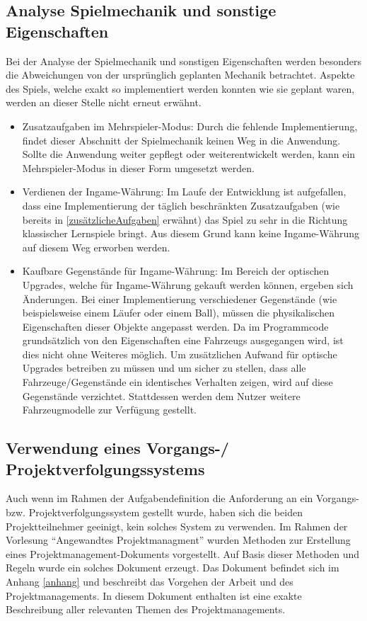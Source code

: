 \subsection{Analyse Spielmechanik und sonstige Eigenschaften}
Bei der Analyse der Spielmechanik und sonstigen Eigenschaften werden besonders die Abweichungen von der ursprünglich geplanten Mechanik betrachtet. Aspekte des Spiels, welche exakt so implementiert werden konnten wie sie geplant waren, werden an dieser Stelle nicht erneut erwähnt.
\begin{itemize}
    \item{Zusatzaufgaben im Mehrspieler-Modus: Durch die fehlende Implementierung, findet dieser Abschnitt der Spielmechanik keinen Weg in die Anwendung. Sollte die Anwendung weiter gepflegt oder weiterentwickelt werden, kann ein Mehrspieler-Modus in dieser Form umgesetzt werden.}
    \item{Verdienen der Ingame-Währung: Im Laufe der Entwicklung ist aufgefallen, dass eine Implementierung der täglich beschränkten Zusatzaufgaben (wie bereits in \ref{zusätzlicheAufgaben} erwähnt) das Spiel zu sehr in die Richtung klassischer Lernspiele bringt. Aus diesem Grund kann keine Ingame-Währung auf diesem Weg erworben werden.}
    \item{Kaufbare Gegenstände für Ingame-Währung: Im Bereich der optischen Upgrades, welche für Ingame-Währung gekauft werden können, ergeben sich Änderungen. Bei einer Implementierung verschiedener Gegenstände (wie beispielsweise einem Läufer oder einem Ball), müssen die physikalischen Eigenschaften dieser Objekte angepasst werden. Da im Programmcode grundsätzlich von den Eigenschaften eine Fahrzeugs ausgegangen wird, ist dies nicht ohne Weiteres möglich. Um zusätzlichen Aufwand für optische Upgrades betreiben zu müssen und um sicher zu stellen, dass alle Fahrzeuge/Gegenstände ein identisches Verhalten zeigen, wird auf diese Gegenstände verzichtet. Stattdessen werden dem Nutzer weitere Fahrzeugmodelle zur Verfügung gestellt.}
\end{itemize}

\subsection{Verwendung eines Vorgangs-/ Projektverfolgungssystems}
Auch wenn im Rahmen der Aufgabendefinition die Anforderung an ein Vorgangs- bzw. Projektverfolgungssystem gestellt wurde, haben sich die beiden Projektteilnehmer geeinigt, kein solches System zu verwenden.
Im Rahmen der Vorlesung \enquote{Angewandtes Projektmanagment} wurden Methoden zur Erstellung eines Projektmanagement-Dokuments vorgestellt. Auf Basis dieser Methoden und Regeln wurde ein solches Dokument erzeugt. Das Dokument befindet sich im Anhang \ref{anhang} und beschreibt das Vorgehen der Arbeit und des Projektmanagements. In diesem Dokument enthalten ist eine exakte Beschreibung aller relevanten Themen des Projektmanagements.

